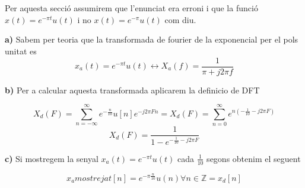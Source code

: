 \documentclass[12pt, a4papre]{article}
\begin{document}
	\section{}
	
	Per aquesta secció assumirem que l'enunciat era erroni i que la funció $x(t)=e^{-\pi t}u(t)$ i no $x(t)=e^{-\pi}u(t)$ com diu.
	
	\textbf{a)} Sabem per teoria que la transformada de fourier de la exponencial per el pols unitat es
	\[
	x_a(t)=e^{-\pi t}u(t) \leftrightarrow X_a(f) = \frac{1}{\pi+j2\pi f}
	\]
	
	\textbf{b)} Per a calcular aquesta transformada aplicarem la definicio de DFT
	
	\[
	X_d(F) = \sum_{n = -\infty}^{\infty}e^{-\frac{n}{10}}u[n]e^{-j2\pi Fn} = X_d(F) = \sum_{n = 0}^{\infty}e^{n(-\frac{1}{10}-j2\pi F)}
	\]
	\[
	X_d(F) = \frac{1}{1 - e^{-\frac{1}{10}-j2\pi F}}
	\]
	
	\textbf{c)} Si mostregem la senyal $x_a(t)=e^{-\pi t}u(t)$ cada $\frac{1}{10}$ segons obtenim el seguent
	
	\[
	x_a mostrejat[n] = e^{-\pi \frac{n}{10}}u(n) \forall n \in \mathbb{Z} = x_d[n]
	\]
	
	\newpage
	\section{}
	
	
	
\end{document}
